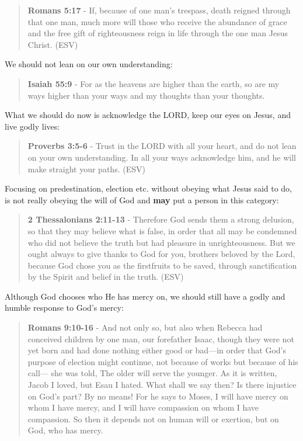 \documentclass[11pt]{article}
\begin{document}
\begin{quote}
\textbf{Romans 5:17} - If, because of one man's trespass, death reigned through that one man, much more will those who receive the abundance of grace and the free gift of righteousness reign in life through the one man Jesus Christ. (ESV)
\end{quote}

We should not lean on our own understanding:

\begin{quote}
\textbf{Isaiah 55:9} - For as the heavens are higher than the earth, so are my ways higher than your ways and my thoughts than your thoughts.
\end{quote}

What we should do now is acknowledge the LORD, keep our eyes on Jesus, and live godly lives:

\begin{quote}
\textbf{Proverbs 3:5-6} - Trust in the LORD with all your heart, and do not lean on your own understanding. In all your ways acknowledge him, and he will make straight your paths. (ESV)
\end{quote}

Focusing on predestination, election etc. without obeying what Jesus said to do, is not really obeying the will of God and \textbf{may} put a person in this category:

\begin{quote}
\textbf{2 Thessalonians 2:11-13} - Therefore God sends them a strong delusion, so that they may believe what is false, in order that all may be condemned who did not believe the truth but had pleasure in unrighteousness.  But we ought always to give thanks to God for you, brothers beloved by the Lord, because God chose you as the firstfruits to be saved, through sanctification by the Spirit and belief in the truth.  (ESV)
\end{quote}

Although God chooses who He has mercy on, we should still have a godly and humble response to God's mercy:

\begin{quote}
\textbf{Romans 9:10-16} - And not only so, but also when Rebecca had conceived children by one man, our forefather Isaac, though they were not yet born and had done nothing either good or bad—in order that God's purpose of election might continue, not because of works but because of his call— she was told, The older will serve the younger. As it is written, Jacob I loved, but Esau I hated. What shall we say then? Is there injustice on God's part? By no means! For he says to Moses, I will have mercy on whom I have mercy, and I will have compassion on whom I have compassion. So then it depends not on human will or exertion, but on God, who has mercy.
\end{quote}
\end{document}
